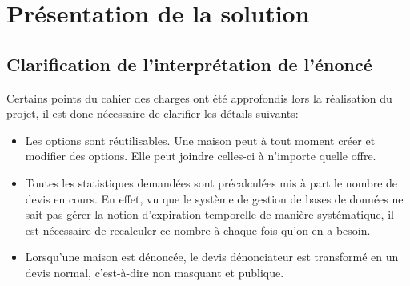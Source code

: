 \documentclass[11pt,a4paper]{report}
\begin{document}
\endgroup

\setlength{\parskip}{\baselineskip}
\chapter{Présentation de la solution}
\section{Clarification de l'interprétation de l'énoncé}
Certains points du cahier des charges ont été approfondis lors la réalisation du projet, il est donc nécessaire de clarifier les détails suivants:
\begin{itemize}\renewcommand{\labelitemi}{$\bullet$}
  \item Les options sont réutilisables. Une maison peut à tout moment créer et modifier des options. Elle
  peut joindre celles-ci à n'importe quelle offre.
  \item Toutes les statistiques demandées sont précalculées mis à part le nombre de devis en cours. En effet, vu que le système de gestion
  de bases de données ne sait pas gérer la notion d'expiration temporelle de manière systématique, il est nécessaire de recalculer ce nombre à chaque fois qu'on en a besoin.
  \item Lorsqu'une maison est dénoncée, le devis dénonciateur est transformé en un devis normal, c'est-à-dire non masquant et publique.
\end{itemize}

\newpage
\end{document}
